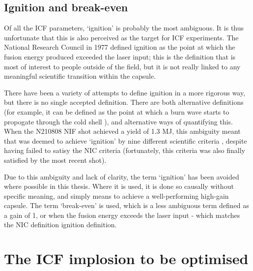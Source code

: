 
\subsection{Ignition and break-even}
Of all the ICF parameters, `ignition' is probably the most ambiguous. It is thus unfortunate that this is also perceived as the target for ICF experiments. The National Research Council in 1977 defined ignition as the point at which the fusion energy produced exceeded the laser input; this is the definition that is most of interest to people outside of the field, but it is not really linked to any meaningful scientific transition within the capsule.

There have been a variety of attempts to define ignition in a more rigorous way, but there is no single accepted definition. There are both alternative definitions (for example, it can be defined as the point at which a burn wave starts to propogate through the cold shell \cite{Christopherson2020}), and alternative ways of quantifying this. When the N210808 NIF shot achieved a yield of 1.3 MJ, this ambiguity meant that was deemed to achieve `ignition' by nine different scientific criteria \cite{Abu-Shawareb2022}, despite having failed to satisy the NIC criteria (fortunately, this criteria was also finally satisfied by the most recent shot).

Due to this ambiguity and lack of clarity, the term `ignition' has been avoided where possible in this thesis. Where it is used, it is done so causally without specific meaning, and simply means to achieve a well-performing high-gain capsule. The term `break-even' is used, which is a less ambiguous term defined as a gain of 1, or when the fusion energy exceeds the laser input - which matches the NIC definition ignition definition.

\section{The ICF implosion to be optimised}


